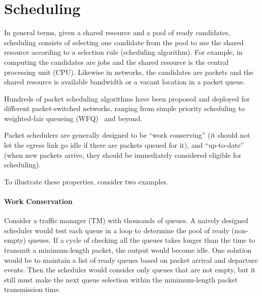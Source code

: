 \section{Scheduling}

In general terms, given a shared resource and a pool of ready candidates, scheduling consists of selecting one candidate from the pool to use the shared resource according to a selection rule (scheduling algorithm).  For example, in computing the candidates are jobs and the shared resource is the central processing unit (CPU).  Likewise in networks, the candidates are packets and the shared resource is available bandwidth or a vacant location in a packet queue.

Hundreds of packet scheduling algorithms have been proposed and deployed for different packet-switched networks, ranging from simple priority scheduling to weighted-fair queueing (WFQ)~\cite{stfq} and beyond. 

Packet schedulers are generally designed to be ``work conserving'' (it should not let the egress link go idle if there are packets queued for it), and ``up-to-date'' (when new packets arrive, they should be immediately considered eligible for scheduling). 

To illustrate these properties, consider two examples.
\paragraph{Work Conservation}
Consider a traffic manager (TM) with thousands of queues. A naively designed scheduler would test each queue in a loop to determine the pool of ready (non-empty) queues.  If a cycle of checking all the queues takes longer than the time to transmit a minimum-length packet, the output would become idle.  One solution would be to maintain a list of ready queues based on packet arrival and departure events.  Then the scheduler would consider only queues that are not empty, but it still must make the next queue selection within the minimum-length packet transmission time.
